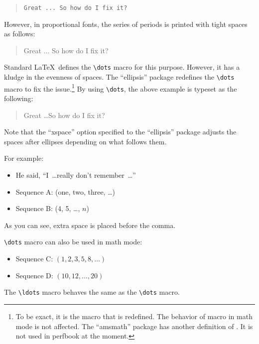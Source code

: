\begin{quote}
  \verb|Great ... So how do I fix it?|
\end{quote}

However, in proportional fonts, the series of periods is printed
with tight spaces as follows:

\begin{quote}
  Great ... So how do I fix it?
\end{quote}

Standard \LaTeX\ defines the \verb|\dots| macro for this purpose.
However, it has a kludge in the evenness of spaces.
The ``ellipsis'' package redefines the \verb|\dots| macro to fix
the issue.\footnote{To be exact, it is the \co{\\textellipsis} macro
  that is redefined.
  The behavior of \co{\\dots} macro in math mode is not affected.
  The ``amsmath'' package has another definition of \co{\\dots}.
  It is not used in perfbook at the moment.}
By using \verb|\dots|, the above example is typeset as the following:

\begin{quote}
  Great \dots So how do I fix it?
\end{quote}

Note that the ``xspace'' option specified to the ``ellipsis'' package
adjusts the spaces after ellipses depending on what follows them.

For example:

\begin{itemize}[itemsep=.2ex]
\item He said, ``I~\dots really don't remember~\dots''
\item Sequence A: (one, two, three, \dots)
\item Sequence B: (4, 5, \dots, $n$)
\end{itemize}

As you can see, extra space is placed before the comma.

\verb|\dots| macro can also be used in math mode:

\begin{itemize}[itemsep=.2ex]
\item Sequence C: $(1, 2, 3, 5, 8, \dots)$
\item Sequence D: $(10, 12, \dots, 20)$
\end{itemize}

The \verb|\ldots| macro behaves the same as the \verb|\dots| macro.

